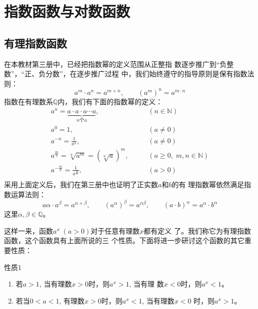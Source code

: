 \chapter{指数函数与对数函数}
\section{有理指数函数}
在本教材第三册中，已经把指数幂的定义范围从正整指
数逐步推广到“负整数”，“正、负分数”，在逐步推广过程
中，我们始终遵守的指导原则是保有指数法则：
\[a^m\cdot a^n=a^{m+n},\qquad  (a^m)^n=a^{m\cdot n}\]
指数在有理数系$\mathbb{Q}$内，我们有下面的指数幂的定义：
\[\begin{split}
  a^n=\underbrace{a\cdot a\cdot a\cdots a}_{\text{$n$个$a$}},&\qquad (n\in\mathbb{N})\\  
a^0=1,&\qquad (a\ne 0)\\  
a^{-n}=\frac{1}{a^n},&\qquad (a\ne 0)\\ 
a^{\tfrac{m}{n}}=\sqrt[n]{a^m}=\left(\sqrt[n]{a}\right)^m,&\qquad (a\ge 0,\; m,n\in\mathbb{N})\\ 
a^{-\tfrac{m}{n}}=\frac{1}{a^{\tfrac{m}{n}}},&\qquad (a> 0)\\ 
\end{split}\]
采用上面定义后，我们在第三册中也证明了正实数$a$和$b$的有
理指数幂依然满足指数运算法则：
\[a{\alpha}\cdot a^{\beta}=a^{\alpha+\beta},\qquad (a^{\alpha})^{\beta}=a^{\alpha\beta},\qquad (a\cdot b)^{\alpha}=a^{\alpha}\cdot b^{\alpha}\]
这里$\alpha,\beta \in \mathbb{Q}$。

这样一来，函数$a^x\; (a>0)$对于任意有理数$x$都有定义
了。我们称它为有理指数函数，这个函数具有上面所说的三
个性质。下面将进一步研讨这个函数的其它重要性质：

\begin{blk}{性质1}
\begin{enumerate}
    \item 若$a>1$, 当有理数$x>0$时，则$a^x>1$, 当有理
    数$x<0$时，则$a^x<1$。
    \item 若当$0<a<1$, 有理数$x>0$时，则$a^x<1$, 当有理数$x<0$
    时，则$a^x>1$。
\end{enumerate}
\end{blk}

